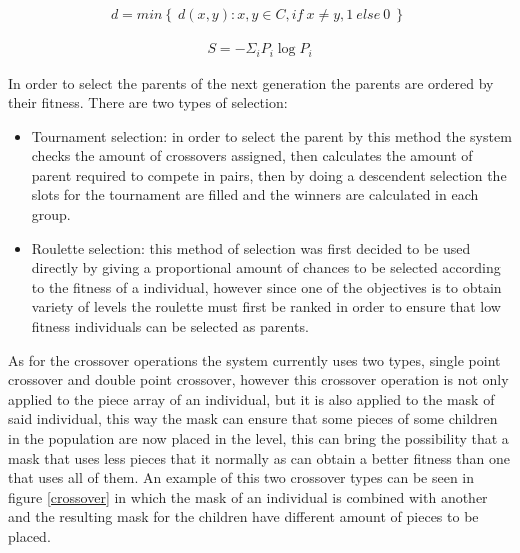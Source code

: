 \documentclass[conference]{IEEEtran}
\begin{document}
    \begin{equation}
        \begin{aligned}
        d = min \left\{ \ d(x,y): x,y \in C, if \: x \neq y, 1 \: else \: 0 \: \right\} \
        \end{aligned}
        \label{hamming_distance}
    \end{equation}
    
    \begin{equation}
        \begin{aligned}
        S = - \Sigma_i P_i \log P_i
        \end{aligned}
        \label{shannon_entropy}
    \end{equation}

    In order to select the parents of the next generation the parents are ordered by
    their fitness. There are two types of selection:
    
    \begin{itemize}
        \item Tournament selection: in order to select the parent by this method the
        system checks the amount of crossovers assigned, then calculates the amount
        of parent required to compete in pairs, then by doing a descendent selection
        the slots for the tournament are filled and the winners are calculated in
        each group.
        \item Roulette selection: this method of selection was first decided to be
        used directly by giving a proportional amount of chances to be selected
        according to the fitness of a individual, however since one of the
        objectives is to obtain variety of levels the roulette must first be ranked
        in order to ensure that low fitness individuals can be selected as parents.
    \end{itemize}
    
    As for the crossover operations the system currently uses two types, single
    point crossover and double point crossover, however this crossover operation is
    not only applied to the piece array of an individual, but it is also applied to
    the mask of said individual, this way the mask can ensure that some pieces of
    some children in the population are now placed in the level, this can bring the
    possibility that a mask that uses less pieces that it normally as can obtain a
    better fitness than one that uses all of them. An example of this two crossover
    types can be seen in figure \ref{crossover} in which the mask of an individual
    is combined with another and the resulting mask for the children have different
    amount of pieces to be placed.
    
\end{document}
